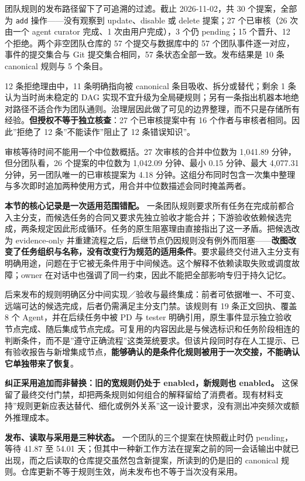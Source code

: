 \documentclass[
]{article}
\begin{document}
团队规则的发布路径留下了可追溯的过滤。截止 2026-11-02，共 30
个提案，全部为 \texttt{add} 操作------没有观察到 update、disable 或
delete 提案；27 个已审核（26 次由一个 agent curator 完成、1
次由用户完成），3 个仍 pending；15 个晋升、12 个拒绝。两个非空团队仓库的
57 个提交与数据库中的 57 个团队事件逐一对应，事件的提交集合与 Git
提交集合相同，57 条状态全部一致。发布结果是 10 条 canonical 规则与 5
个条目。

12 条拒绝理由中，11 条明确指向被 canonical 条目吸收、拆分或替代；剩余 1
条认为当时尚未稳定的 DAG
实现不宜升级为全局硬规则；另有一条指出机器本地绝对路径不适合作为团队通则。治理层因此做了可见的边界整理，而不只是存储所有经验。\textbf{但授权不等于独立核查}：27
个已审核提案中有 16 个作者与审核者相同。因此''拒绝了 12
条''不能读作''阻止了 12 条错误知识''。

审核等待时间不能用一个中位数概括。27 次审核的合并中位数为 1,041.89
分钟，但分团队看，26 个提案的中位数为 1,042.09 分钟、最小 0.15
分钟、最大 4,077.31 分钟，另一团队唯一的已审核提案为 4.18
分钟。这组分布同时包含一次集中整理与多次即时追加两种使用方式，用合并中位数描述会同时掩盖两者。

\textbf{本节的核心记录是一次适用范围错配。}
一条团队规则要求所有任务在完成前都合入主分支，而候选任务的合同又要求先独立验收才能合并；下游验收依赖候选完成，两条规定因此形成循环。任务的原生阻塞理由直接指出了这一矛盾。把候选改为
evidence-only
并重建流程之后，后继节点仍因规则没有例外而阻塞------\textbf{改图改变了任务组织与名称，没有改变行为规范的适用条件}。要求最终交付进入主分支有明确用途，问题在于它被无条件用于中间候选。这个解释不依赖读取失败或调度故障；owner
在对话中也强调了同一约束，因此不能把全部影响专归于持久记忆。

后来发布的规则明确区分中间实现／验收与最终集成：前者可依据唯一、不可变、远端可达的候选完成，后者仍需满足主分支门禁。该规则有
19 条正文回执、覆盖 8 个 Agent，并在后续任务中被 PD 与 tester
明确引用，原生事件显示独立验收节点完成、随后集成节点完成。可复用的内容因此是与候选标识和任务阶段相连的判断条件，而不是''遵守正确流程''这类笼统要求。但该片段同时存在人工提示、已有验收报告与新增集成节点，\textbf{能够确认的是条件化规则被用于一次交接，不能确认它单独带来了恢复}。

\textbf{纠正采用追加而非替换：旧的宽规则仍处于 enabled，新规则也
enabled。}
这保留了最终交付门禁，却把两条规则如何组合的解释留给了消费者。现有材料支持''规则更新应表达替代、细化或例外关系''这一设计要求，没有测出冲突频次或额外推理成本。

\textbf{发布、读取与采用是三种状态。} 一个团队的三个提案在快照截止时仍
pending，等待 41.87 至 54.01
天；但其中一种新工作方法在提案之前的同一会话输出中就已出现，而之后读取的仓库提交虽然包含新提案，所读到的仍是旧的
canonical 规则。仓库更新不等于规则生效，尚未发布也不等于当次没有采用。
\end{document}

